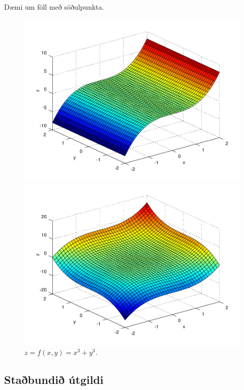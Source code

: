 Dæmi um föll með söðulpunkta.
   \begin{figure}[!h]
        \centering
        \begin{minipage}{.5\textwidth}
            \centering
            \includegraphics[width=.9\linewidth]{sodull1.png}
            \caption*{$z = f(x,y) = x^3$.}
        \end{minipage}%
        \begin{minipage}{.5\textwidth}
            \centering
            \includegraphics[width=.9\linewidth]{sodull2.png}
            \caption*{$z = f(x,y) = x^3+y^3$.}
        \end{minipage}
        
    \end{figure}



\subsection{Staðbundið útgildi} 

